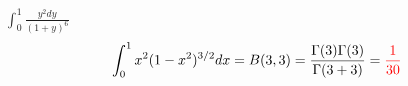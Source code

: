 \item [5.] \( \displaystyle \int_0^1 \frac{y^2dy}{(1+y)^6}\)
\[
    \int_0^1 x^2(1-x^2)^{3/2}dx
    = B(3,3)=\frac{\Gamma(3)\Gamma(3)}{\Gamma(3+3)}=\textcolor{red}{\frac{1}{30}}
\]